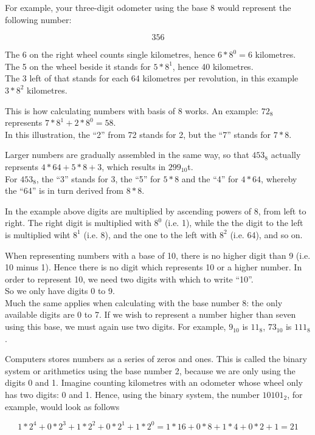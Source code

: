 \documentclass[a4paper,11pt,oneside,openright,titlepage]{scrbook}
\begin{document}
For example, your three-digit odometer using the base 8 would
represent the following number:

\[ 356 \]

The 6 on the right wheel counts single kilometres, hence $6*8^0=6$
kilometres.\\
The 5 on the wheel beside it stands for $5 * 8^1$, hence 40
kilometres.\\
The 3 left of that stands for each 64 kilometres per revolution, in
this example $3 * 8^2$ kilometres.

This is how calculating numbers with basis of 8 works. An example:
$72_8$ represents $7 * 8^1 + 2 * 8^0 =  58$. \\
In this illustration, the ``2'' from 72 stands for 2, but the ``7''
stands for $7 * 8$.

Larger numbers are gradually assembled in the same way, so that
$453_8$ actually reprsents $4 * 64 + 5 * 8 + 3$, which results in
$299_{10}$t.\\
For $453_8$, the ``3'' stands for 3, the ``5'' for $5 * 8$ and the
``4'' for $4 * 64$, whereby the ``64'' is in turn derived from $8 *
8$.

In the example above digits are multiplied by ascending powers of 8,
from left to right. The right digit is multiplied with $8^0$ (i.e. 1),
while the the digit to the left is multiplied wiht $8^1$ (i.e. 8), and
the one to the left with $8^2$ (i.e. 64), and so on.

When representing numbers with a base of 10, there is no higher digit
than 9 (i.e. 10 minus 1). Hence there is no digit which represents 10
or a higher number. In order to represent 10, we need two digits with
which to write ``10''.\\
So we only have digits 0 to 9.\\
Much the same applies when calculating with the base number 8: the
only available digits are 0 to 7. If we wish to represent a number
higher than seven using this base, we must again use two digits. For
example, $9_{10}$ is $11_8$, $73_{10}$ is $111_8$.


\clearpage
Computers stores numbers as a series of zeros and ones. This is called
the binary system or arithmetics using the base number 2, because we
are only using the digits 0 and 1. Imagine counting kilometres with an
odometer whose wheel only has two digits: 0 and 1. Hence, using the
binary system, the number  $10101_2$, for example, would look as
follows

\[ 1*2^4+0*2^3+1*2^2+0*2^1+1*2^0 = 1 * 16 + 0 * 8 + 1 * 4 + 0 * 2 + 1 = 21 \]
\end{document}

